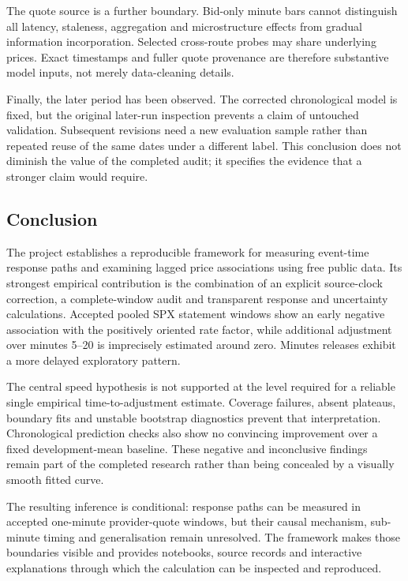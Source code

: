 The quote source is a further boundary. Bid-only minute bars cannot distinguish all latency, staleness, aggregation and microstructure effects from gradual information incorporation. Selected cross-route probes may share underlying prices. Exact timestamps and fuller quote provenance are therefore substantive model inputs, not merely data-cleaning details.

Finally, the later period has been observed. The corrected chronological model is fixed, but the original later-run inspection prevents a claim of untouched validation. Subsequent revisions need a new evaluation sample rather than repeated reuse of the same dates under a different label. This conclusion does not diminish the value of the completed audit; it specifies the evidence that a stronger claim would require.

\subsection{Conclusion}
The project establishes a reproducible framework for measuring event-time response paths and examining lagged price associations using free public data. Its strongest empirical contribution is the combination of an explicit source-clock correction, a complete-window audit and transparent response and uncertainty calculations. Accepted pooled SPX statement windows show an early negative association with the positively oriented rate factor, while additional adjustment over minutes 5--20 is imprecisely estimated around zero. Minutes releases exhibit a more delayed exploratory pattern.

The central speed hypothesis is not supported at the level required for a reliable single empirical time-to-adjustment estimate. Coverage failures, absent plateaus, boundary fits and unstable bootstrap diagnostics prevent that interpretation. Chronological prediction checks also show no convincing improvement over a fixed development-mean baseline. These negative and inconclusive findings remain part of the completed research rather than being concealed by a visually smooth fitted curve.

The resulting inference is conditional: response paths can be measured in accepted one-minute provider-quote windows, but their causal mechanism, sub-minute timing and generalisation remain unresolved. The framework makes those boundaries visible and provides notebooks, source records and interactive explanations through which the calculation can be inspected and reproduced.

